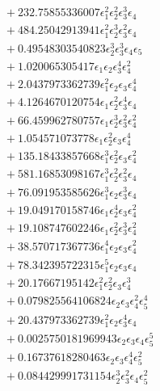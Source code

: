 \documentclass[10pt]{article}
\begin{document}
\begin{align*}
&{}  + 232.75855336007 \epsilon_{1}^{2} \epsilon_{2}^{2} \epsilon_{3}^{3} \epsilon_{4} \\
&{}  + 484.25042913941 \epsilon_{1}^{2} \epsilon_{2}^{3} \epsilon_{3}^{2} \epsilon_{4} \\
&{}  + 0.49548303540823 \epsilon_{2}^{3} \epsilon_{3}^{3} \epsilon_{4} \epsilon_{5} \\
&{}  + 1.020065305417 \epsilon_{1} \epsilon_{2} \epsilon_{3}^{4} \epsilon_{4}^{2} \\
&{}  + 2.0437973362739 \epsilon_{1}^{2} \epsilon_{2} \epsilon_{3} \epsilon_{4}^{4} \\
&{}  + 4.1264670120754 \epsilon_{1} \epsilon_{2}^{2} \epsilon_{3}^{4} \epsilon_{4} \\
&{}  + 66.459962780757 \epsilon_{1} \epsilon_{2}^{3} \epsilon_{3}^{2} \epsilon_{4}^{2} \\
&{}  + 1.054571073778 \epsilon_{1} \epsilon_{2}^{2} \epsilon_{3} \epsilon_{4}^{4} \\
&{}  + 135.18433857668 \epsilon_{1}^{3} \epsilon_{2}^{2} \epsilon_{3} \epsilon_{4}^{2} \\
&{}  + 581.16853098167 \epsilon_{1}^{3} \epsilon_{2}^{2} \epsilon_{3}^{2} \epsilon_{4} \\
&{}  + 76.091953585626 \epsilon_{1}^{3} \epsilon_{2} \epsilon_{3}^{3} \epsilon_{4} \\
&{}  + 19.049170158746 \epsilon_{1} \epsilon_{2}^{4} \epsilon_{3} \epsilon_{4}^{2} \\
&{}  + 19.108747602246 \epsilon_{1} \epsilon_{2}^{2} \epsilon_{3}^{3} \epsilon_{4}^{2} \\
&{}  + 38.570717367736 \epsilon_{1}^{4} \epsilon_{2} \epsilon_{3} \epsilon_{4}^{2} \\
&{}  + 78.342395722315 \epsilon_{1}^{5} \epsilon_{2} \epsilon_{3} \epsilon_{4} \\
&{}  + 20.17667195142 \epsilon_{1}^{2} \epsilon_{2}^{2} \epsilon_{3} \epsilon_{4}^{3} \\
&{}  + 0.079825564106824 \epsilon_{2} \epsilon_{3} \epsilon_{4}^{2} \epsilon_{5}^{4} \\
&{}  + 20.437973362739 \epsilon_{1}^{2} \epsilon_{2} \epsilon_{3}^{4} \epsilon_{4} \\
&{}  + 0.0025750181969943 \epsilon_{2} \epsilon_{3} \epsilon_{4} \epsilon_{5}^{5} \\
&{}  + 0.16737618280463 \epsilon_{2} \epsilon_{3} \epsilon_{4}^{4} \epsilon_{5}^{2} \\
&{}  + 0.084429991731154 \epsilon_{2}^{3} \epsilon_{3}^{2} \epsilon_{4} \epsilon_{5}^{2} \\

\end{align*}
\end{document}
